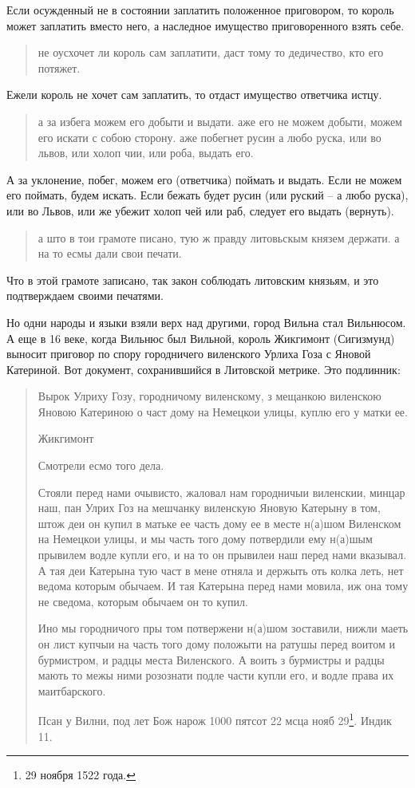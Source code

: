 Если осужденный не в состоянии заплатить положенное приговором, то король может заплатить вместо него, а наследное имущество приговоренного взять себе.

\begin{quotation}
не оусхочет ли король сам заплатити, даст тому то дедичество, кто его потяжет.
\end{quotation}

Ежели король не хочет сам заплатить, то отдаст имущество ответчика истцу.

\begin{quotation}
а за избега можем его добыти и выдати. аже его не можем добыти, можем его искати с собою сторону. аже побегнет русин а любо руска, или во львов, или холоп чии, или роба, выдать его.
\end{quotation}

А за уклонение, побег, можем его (ответчика) поймать и выдать. Если не можем его поймать, будем искать. Если бежать будет русин (или руский – а любо руска), или во Львов, или же убежит холоп чей или раб, следует его выдать (вернуть).

\begin{quotation}
а што в тои грамоте писано, тую ж правду литовьскым князем держати. а на то есмы дали свои печати.
\end{quotation}

Что в этой грамоте записано, так закон соблюдать литовским князьям, и это подтверждаем своими печатями.

Но одни народы и языки взяли верх над другими, город Вильна стал Вильнюсом. А еще в 16 веке, когда Вильнюс был Вильной, король Жикгимонт (Сигизмунд) выносит приговор по спору городничего виленского Урлиха Гоза с Яновой Катериной. Вот документ, сохранившийся в Литовской метрике. Это подлинник:

\begin{quotation}
Вырок Улриху Гозу, городничому виленскому, з мещанкою виленскою Яновою Катериною о част дому на Немецкои улицы, куплю его у матки ее.

Жикгимонт

Смотрели есмо того дела.

Стояли перед нами очывисто, жаловал нам городничыи виленскии, минцар наш, пан Улрих Гоз на мешчанку виленскую Яновую Катерыну в том, штож деи он купил в матьке ее часть дому ее в месте н(а)шом Виленском на Немецкои улицы, и мы часть того дому потвердили ему н(а)шым прывилем водле купли его, и на то он прывилеи наш перед нами вказывал. А тая деи Катерына тую част в мене отняла и держыть оть колка леть, нет ведома которым обычаем. И тая Катерына перед нами мовила, иж она тому не сведома, которым обычаем он то купил.

Ино мы городничого пры том потвержени н(а)шом зоставили, нижли маеть он лист купчыи на часть того дому положыти на ратушы перед воитом и бурмистром, и радцы места Виленского. А воить з бурмистры и радцы мають то межы ними розознати подле части купли его, и водле права их маитбарского.

Псан у Вилни, под лет Бож нарож 1000 пятсот 22 мсца нояб 29\footnote{29 ноября 1522 года.}. Индик 11.
\end{quotation}


